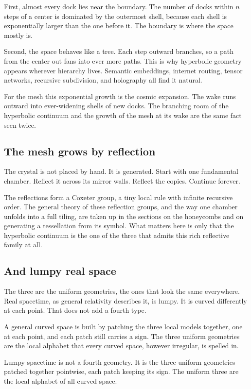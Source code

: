 First, almost every dock lies near the boundary. The number of docks within $n$ steps of a center is dominated by the outermost shell, because each shell is exponentially larger than the one before it. The boundary is where the space mostly is.

Second, the space behaves like a tree. Each step outward branches, so a path from the center out fans into ever more paths. This is why hyperbolic geometry appears wherever hierarchy lives. Semantic embeddings, internet routing, tensor networks, recursive subdivision, and holography all find it natural.

For the mesh this exponential growth is the cosmic expansion. The wake runs outward into ever-widening shells of new docks. The branching room of the hyperbolic continuum and the growth of the mesh at its wake are the same fact seen twice.

\subsection{The mesh grows by reflection}

The crystal is not placed by hand. It is generated. Start with one fundamental chamber. Reflect it across its mirror walls. Reflect the copies. Continue forever.

The reflections form a Coxeter group, a tiny local rule with infinite recursive order. The general theory of these reflection groups, and the way one chamber unfolds into a full tiling, are taken up in the sections on the honeycombs and on generating a tessellation from its symbol. What matters here is only that the hyperbolic continuum is the one of the three that admits this rich reflective family at all.

\subsection{And lumpy real space}

The three are the uniform geometries, the ones that look the same everywhere. Real spacetime, as general relativity describes it, is lumpy. It is curved differently at each point. That does not add a fourth type.

A general curved space is built by patching the three local models together, one at each point, and each patch still carries a sign. The three uniform geometries are the local alphabet that every curved space, however irregular, is spelled in.

\begin{principle}
Lumpy spacetime is not a fourth geometry. It is the three uniform geometries patched together pointwise, each
patch keeping its sign. The uniform three are the local alphabet of all curved space.
\end{principle}

